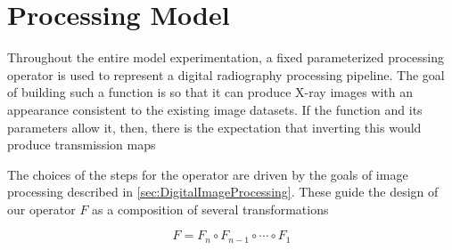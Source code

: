 \documentclass[nomenclature, english, bibtex]{kththesis}
\numberwithin{listing}{chapter}
\begin{document}
\section{Processing Model}

Throughout the entire model experimentation, a fixed parameterized processing operator is used to represent a
digital radiography processing pipeline. The goal of building such a function is so that it can produce
X-ray images with an appearance consistent to the existing image datasets. If the function and its parameters
allow it, then, there is the expectation that inverting this would produce transmission maps

The choices of the steps for the operator are driven by the goals of image processing described
in \autoref{sec:DigitalImageProcessing}. These guide the design of our operator $F$ as a composition
of several transformations

\begin{equation}
F = F_n \circ F_{n-1} \circ \cdots \circ F_1
\end{equation}
\end{document}
